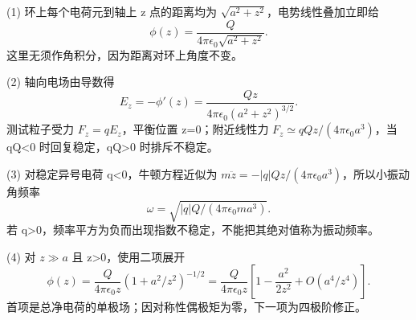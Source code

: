 (1) 环上每个电荷元到轴上 z 点的距离均为 \(\sqrt{a^2+z^2}\)，电势线性叠加立即给
\[
\phi(z)=\frac{Q}{4\pi\epsilon_0\sqrt{a^2+z^2}}.
\]
这里无须作角积分，因为距离对环上角度不变。

(2) 轴向电场由导数得
\[
E_z=-\phi'(z)=\frac{Qz}{4\pi\epsilon_0(a^2+z^2)^{3/2}}.
\]
测试粒子受力 \(F_z=qE_z\)，平衡位置 z=0；附近线性力 \(F_z\simeq qQz/(4\pi\epsilon_0a^3)\)，当 qQ<0 时回复稳定，qQ>0 时排斥不稳定。

(3) 对稳定异号电荷 q<0，牛顿方程近似为 \(m\ddot z=-|q|Qz/(4\pi\epsilon_0a^3)\)，所以小振动角频率
\[
\omega=\sqrt{|q|Q/(4\pi\epsilon_0ma^3)}.
\]
若 q>0，频率平方为负而出现指数不稳定，不能把其绝对值称为振动频率。

(4) 对 \(z\gg a\) 且 z>0，使用二项展开
\[
\phi(z)=\frac{Q}{4\pi\epsilon_0z}(1+a^2/z^2)^{-1/2}
=\frac{Q}{4\pi\epsilon_0z}\left[1-\frac{a^2}{2z^2}+O(a^4/z^4)\right].
\]
首项是总净电荷的单极场；因对称性偶极矩为零，下一项为四极阶修正。
